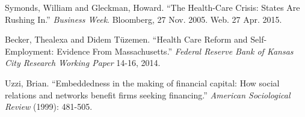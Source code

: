 \documentclass[12pt]{article}
\begin{document}
\begin{thebibliography}{99}
Symonds, William and Gleckman, Howard.  ``The Health-Care Crisis: States Are Rushing In.'' \emph{Business Week}. Bloomberg, 27 Nov. 2005. Web. 27 Apr. 2015.



\begin{comment}

http://dish.andrewsullivan.com/2014/04/16/obamas-meep-meep-on-health-care


\bibitem{businessweek}
Symonds, William C. ``In Massachusetts, Health Care for All?'' Bloomberg Business Week. Bloomberg, 03 Apr. 2006. Web. 26 Jan. 2015.

\bibitem{wooldridgeBook}
Wooldridge, J. M.  2002.  Econometric Analysis of Cross Section and Panel Data.  Cambridge, MA: MIT Press.

\bibitem{census}
http://www.census.gov/prod/2008pubs/p60-235.pdf

Insured if covered by any kind of health insurance for all or part of the previous year

\bibitem{globe}
http://managinghealthcarecosts.blogspot.com/2011/06/romneycare-works.html
2008 drop in uninsured and spike in costs

\bibitem{chia}
Asks if they currently have health insurance. 2008, summer, other years spring


\bibitem{individual}
https://www.power2u.org/downloads/Mass-health-care-reform-2011.pdf
Individual plan enrollment grew between 2006 and 2008

\bibitem{summers}
Mandated Benefit Incidence (Summers, 1989)


\end{comment}

Becker, Thealexa and Didem T\"{u}zemen. ``Health Care Reform and Self-Employment: Evidence From Massachusetts.'' \emph{Federal Reserve Bank of Kansas City Research Working Paper} 14-16, 2014.

Uzzi, Brian. ``Embeddedness in the making of financial capital: How social relations and networks benefit firms seeking financing.'' \emph{American Sociological Review} (1999): 481-505.

\end{thebibliography}
\end{document}
